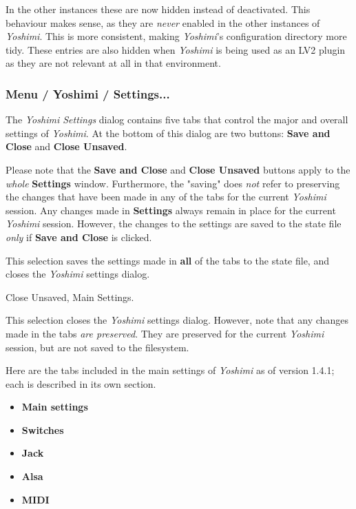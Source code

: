    In the other instances these are now hidden instead of deactivated.  This
   behaviour makes sense, as they are \textsl{never} enabled in the other
   instances of \textsl{Yoshimi}. This is more consistent, making
   \textsl{Yoshimi}'s configuration directory more tidy. These entries are
   also hidden when \textsl{Yoshimi} is being used as an LV2 plugin as they
   are not relevant at all in that environment.

\subsubsection{Menu / Yoshimi / Settings...}
\label{subsubsec:menu_yoshimi_settings}

   The \textsl{Yoshimi Settings} dialog contains five tabs that control the
   major and overall settings of \textsl{Yoshimi}.  At the bottom of this
   dialog are two buttons:
   \textbf{Save and Close} and \textbf{Close Unsaved}.

   Please note that the \textbf{Save and Close} and \textbf{Close Unsaved}
   buttons apply to the \textsl{whole}
   \textbf{Settings} window.
   Furthermore, the "saving" does \textsl{not} refer to preserving the changes
   that have been made
   in any of the tabs for the current \textsl{Yoshimi} session.  Any changes
   made in \textbf{Settings} always remain in place for the current
   \textsl{Yoshimi} session.
   However, the changes to the settings are saved to
   the state file \textsl{only} if \textbf{Save and Close} is clicked.

   \setcounter{ItemCounter}{0}      %

   This selection saves the settings made in \textbf{all} of the tabs to the
   state file, and closes the \textsl{Yoshimi} settings dialog.

   Close Unsaved, Main Settings.

   This selection closes the \textsl{Yoshimi} settings dialog.
   However, note that any changes made in the tabs
   \textsl{are preserved}.  They are preserved for the current
   \textsl{Yoshimi} session, but are not saved to the filesystem.

   Here are the tabs included in the main settings of \textsl{Yoshimi}
   as of version 1.4.1; each is described in its own section.

   \begin{itemize}
      \item \textbf{Main settings}
      \item \textbf{Switches}
      \item \textbf{Jack}
      \item \textbf{Alsa}
      \item \textbf{MIDI}
   \end{itemize}


